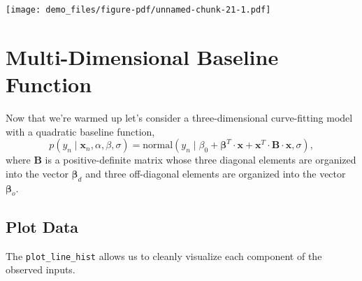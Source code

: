 \documentclass[
  letterpaper,
  DIV=11,
  numbers=noendperiod]{scrartcl}
\begin{document}
\texttt{[image: demo\_files/figure-pdf/unnamed-chunk-21-1.pdf]}

\section{Multi-Dimensional Baseline
Function}\label{multi-dimensional-baseline-function}

Now that we're warmed up let's consider a three-dimensional
curve-fitting model with a quadratic baseline function, \[
p(y_{n} \mid \mathbf{x}_{n}, \alpha, \beta, \sigma)
=
\text{normal}(y_{n}   \mid \beta_{0}
                    + \boldsymbol{\beta}^{T} \cdot \mathbf{x}
                    + \mathbf{x}^{T} \cdot \mathbf{B} \cdot \mathbf{x}, \sigma),
\] where \(\mathbf{B}\) is a positive-definite matrix whose three
diagonal elements are organized into the vector
\(\boldsymbol{\beta}_{d}\) and three off-diagonal elements are organized
into the vector \(\boldsymbol{\beta}_{o}\).

\subsection{Plot Data}\label{plot-data}

The \texttt{plot\_line\_hist} allows us to cleanly visualize each
component of the observed inputs.
\end{document}
